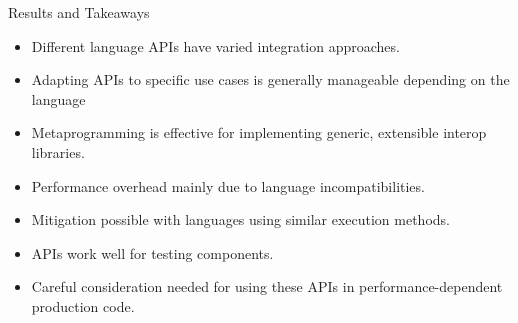 \begin{frame}{Results and Takeaways}
    \begin{itemize}
        \item Different language APIs have varied integration approaches.
        \item Adapting APIs to specific use cases is generally manageable depending on the language
        \item Metaprogramming is effective for implementing generic, extensible interop libraries.
        \item Performance overhead mainly due to language incompatibilities.
        \item Mitigation possible with languages using similar execution methods.
        \item APIs work well for testing components.
        \item Careful consideration needed for using these APIs in performance-dependent production code.
    \end{itemize}
\end{frame}